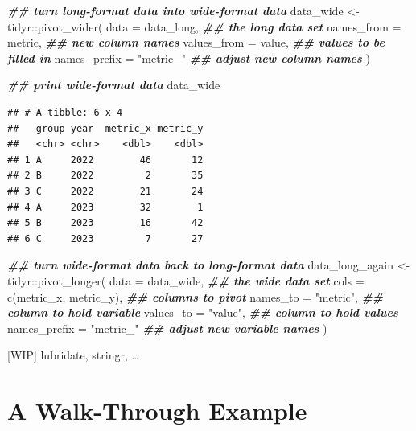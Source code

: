 \documentclass[
]{krantz}
\makeatletter
\newenvironment{Shaded}{\begin{snugshade}}{\end{snugshade}}
\newcommand{\AttributeTok}[1]{\textcolor[rgb]{0.61,0.61,0.61}{#1}}
\newcommand{\DocumentationTok}[1]{\textcolor[rgb]{0.37,0.37,0.37}{\textbf{\textit{#1}}}}
\newcommand{\FunctionTok}[1]{\textcolor[rgb]{0,0,0}{#1}}
\newcommand{\NormalTok}[1]{#1}
\newcommand{\OtherTok}[1]{\textcolor[rgb]{0.37,0.37,0.37}{#1}}
\newcommand{\SpecialCharTok}[1]{\textcolor[rgb]{0,0,0}{#1}}
\newcommand{\StringTok}[1]{\textcolor[rgb]{0.5,0.5,0.5}{#1}}
\newenvironment{kframe}{%
\medskip{}
\setlength{\fboxsep}{.8em}
 \def\at@end@of@kframe{}%
 \ifinner\ifhmode%
  \def\at@end@of@kframe{\end{minipage}}%
  \begin{minipage}{\columnwidth}%
 \fi\fi%
 \def\FrameCommand##1{\hskip\@totalleftmargin \hskip-\fboxsep
 \colorbox{shadecolor}{##1}\hskip-\fboxsep
     \hskip-\linewidth \hskip-\@totalleftmargin \hskip\columnwidth}%
 \MakeFramed {\advance\hsize-\width
   \@totalleftmargin\z@ \linewidth\hsize
   \@setminipage}}%
 {\par\unskip\endMakeFramed%
 \at@end@of@kframe}
\renewenvironment{Shaded}{\begin{kframe}}{\end{kframe}}
\makeatother
\begin{document}
\begin{Shaded}
\begin{Highlighting}[]
\DocumentationTok{\#\# turn long{-}format data into wide{-}format data}
\NormalTok{data\_wide }\OtherTok{\textless{}{-}}\NormalTok{ tidyr}\SpecialCharTok{::}\FunctionTok{pivot\_wider}\NormalTok{(}
  \AttributeTok{data =}\NormalTok{ data\_long,        }\DocumentationTok{\#\# the long data set}
  \AttributeTok{names\_from =}\NormalTok{ metric,     }\DocumentationTok{\#\# new column names}
  \AttributeTok{values\_from =}\NormalTok{ value,     }\DocumentationTok{\#\# values to be filled in}
  \AttributeTok{names\_prefix =} \StringTok{"metric\_"} \DocumentationTok{\#\# adjust new column names}
\NormalTok{)}

\DocumentationTok{\#\# print wide{-}format data}
\NormalTok{data\_wide}
\end{Highlighting}
\end{Shaded}

\begin{verbatim}
## # A tibble: 6 x 4
##   group year  metric_x metric_y
##   <chr> <chr>    <dbl>    <dbl>
## 1 A     2022        46       12
## 2 B     2022         2       35
## 3 C     2022        21       24
## 4 A     2023        32        1
## 5 B     2023        16       42
## 6 C     2023         7       27
\end{verbatim}

\begin{Shaded}
\begin{Highlighting}[]
\DocumentationTok{\#\# turn wide{-}format data back to long{-}format data}
\NormalTok{data\_long\_again }\OtherTok{\textless{}{-}}\NormalTok{ tidyr}\SpecialCharTok{::}\FunctionTok{pivot\_longer}\NormalTok{(}
  \AttributeTok{data =}\NormalTok{ data\_wide,             }\DocumentationTok{\#\# the wide data set}
  \AttributeTok{cols =} \FunctionTok{c}\NormalTok{(metric\_x, metric\_y), }\DocumentationTok{\#\# columns to pivot}
  \AttributeTok{names\_to =} \StringTok{"metric"}\NormalTok{,          }\DocumentationTok{\#\# column to hold variable}
  \AttributeTok{values\_to =} \StringTok{"value"}\NormalTok{,          }\DocumentationTok{\#\# column to hold values}
  \AttributeTok{names\_prefix =} \StringTok{"metric\_"}      \DocumentationTok{\#\# adjust new variable names}
\NormalTok{)}
\end{Highlighting}
\end{Shaded}

{[}WIP{]} lubridate, stringr, \ldots{}

\hypertarget{walkthrough}{%
\chapter{A Walk-Through Example}\label{walkthrough}}
\end{document}
